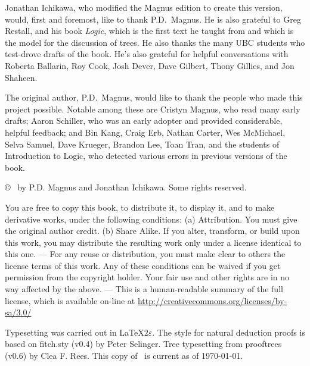 {\sf
Jonathan Ichikawa, who modified the Magnus edition to create this version, would, first and foremost, like to thank P.D.\ Magnus. He is also grateful to Greg Restall, and his book \emph{Logic}, which is the first text he taught from and which is the model for the discussion of trees. He also thanks the many UBC students who test-drove drafts of the book. He's also grateful for helpful conversations with Roberta Ballarin, Roy Cook, Josh Dever, Dave Gilbert, Thony Gillies, and Jon Shaheen.

The original author, P.D.\ Magnus, would like to thank the people who made this project possible. Notable among these are Cristyn Magnus, who read many early drafts; Aaron Schiller, who was an early adopter and provided considerable, helpful feedback; {and} Bin Kang, Craig Erb, Nathan Carter, Wes McMichael, Selva Samuel, Dave Krueger, Brandon Lee, Toan Tran, and the students of Introduction to Logic, who detected various errors in previous versions of the book.
}

\vfill
{
\copyright\  by P.D. Magnus and Jonathan Ichikawa. Some rights reserved.
}

{\footnotesize
You are free to copy this book, to distribute it, to display it, and to make derivative works, under the following conditions: (a) Attribution. You must give the original author credit. (b) Share Alike. If you alter, transform, or build upon this work, you may distribute the resulting work only under a license identical to this one. --- For any reuse or distribution, you must make clear to others the license terms of this work. Any of these conditions can be waived if you get permission from the copyright holder. Your fair use and other rights are in no way affected by the above. --- This is a human-readable summary of the full license, which is available on-line at \url{http://creativecommons.org/licenses/by-sa/3.0/}

Typesetting was carried out  in \LaTeX$2\varepsilon$. The style for natural deduction proofs is based on fitch.sty (v0.4) by Peter Selinger. Tree typesetting from prooftrees (v0.6) by Clea F. Rees. This copy of \forallx\ is current as of \today.
}
